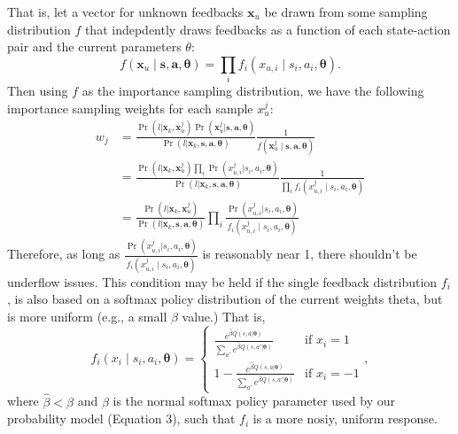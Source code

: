 \documentclass{article}
\begin{document}
That is, let a vector for unknown feedbacks $\bm{x}_u$ be drawn from some sampling distribution $f$ that indepdently draws feedbacks as a function of each state-action pair and the current parameters $\theta$:
\begin{equation}
f(\bm{x}_u \mid \bm{s}, \bm{a}, \bm{\theta}) = \prod_i f_i(x_{u,i} \mid s_i, a_i, \bm{\theta}).
\end{equation}
Then using $f$ as the importance sampling distribution, we have the following importance sampling weights for each sample $x_u^j$:
\begin{align}
w_j &= \frac{\Pr(l | \bm{x}_k, \bm{x}_u^j) \Pr(\bm{x}_u^j | \bm{s}, \bm{a}, \bm{\theta}) }{\Pr(l | \bm{x}_k, \bm{s}, \bm{a}, \bm{\theta})} \frac{1}{f(\bm{x}_u^j \mid \bm{s}, \bm{a}, \bm{\theta})} \nonumber \\
&= \frac{\Pr(l | \bm{x}_k, \bm{x}_u^j) \prod_i \Pr(x_{u,i}^j | s_i, a_i, \bm{\theta}) }{\Pr(l | \bm{x}_k, \bm{s}, \bm{a}, \bm{\theta})} \frac{1}{\prod_i f_i(x_{u,i}^j \mid s_i, a_i, \bm{\theta})} \nonumber \\
&=\frac{\Pr(l | \bm{x}_k, \bm{x}_u^j)}{\Pr(l | \bm{x}_k, \bm{s}, \bm{a}, \bm{\theta})} \prod_i \frac{\Pr(x_{u,i}^j | s_i, a_i, \bm{\theta})}{f_i(x_{u,i}^j \mid s_i, a_i, \bm{\theta})}
\end{align}
Therefore, as long as $\frac{\Pr(x_{u,i}^j | s_i, a_i, \bm{\theta})}{f_i(x_{u,i}^j \mid s_i, a_i, \bm{\theta})}$ is reasonably near 1, there shouldn't be underflow issues. This condition may be held if the single feedback distribution $f_i$, is also based on a softmax policy distribution of the current weights theta, but is more uniform (e.g., a small $\beta$ value.) That is,
\begin{equation}
f_i(x_i \mid s_i, a_i, \bm{\theta}) = \begin{cases}
\frac{e^{\hat{\beta} Q(s,a | \bm{\theta})}}{\sum_{a'}e^{\hat{\beta} Q(s,a' | \bm{\theta})}} & \mbox{if } x_i = 1 \\
1 - \frac{e^{\hat{\beta} Q(s,a | \bm{\theta})}}{\sum_{a'}e^{\hat{\beta} Q(s,a' | \bm{\theta})}} & \mbox{if } x_i = -1
\end{cases},
\end{equation}
where $\hat{\beta} < \beta$ and $\beta$ is the normal softmax policy parameter used by our probability model (Equation 3), such that $f_i$ is a more nosiy, uniform response.
\end{document}
